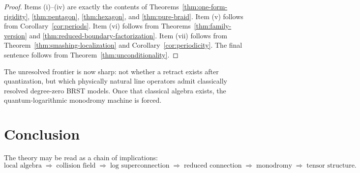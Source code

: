 \begin{proof}
Items (i)--(iv) are exactly the contents of Theorems~\ref{thm:one-form-rigidity}, \ref{thm:pentagon}, \ref{thm:hexagon}, and \ref{thm:pure-braid}. Item (v) follows from Corollary~\ref{cor:periods}. Item (vi) follows from Theorems~\ref{thm:family-version} and \ref{thm:reduced-boundary-factorization}. Item (vii) follows from Theorem~\ref{thm:smashing-localization} and Corollary~\ref{cor:periodicity}. The final sentence follows from Theorem~\ref{thm:unconditionality}.
\end{proof}

\begin{remark}
The unresolved frontier is now sharp: not whether a retract exists after quantization, but which physically natural line operators admit classically resolved degree-zero BRST models. Once that classical algebra exists, the quantum-logarithmic monodromy machine is forced.
\end{remark}

\section{Conclusion}%

The theory may be read as a chain of implications:
\begin{equation}%
\text{local algebra}
\;\Longrightarrow\;
\text{collision field}
\;\Longrightarrow\;
\text{log superconnection}
\;\Longrightarrow\;
\text{reduced connection}
\;\Longrightarrow\;
\text{monodromy}
\;\Longrightarrow\;
\text{tensor structure}.
\end{equation}

